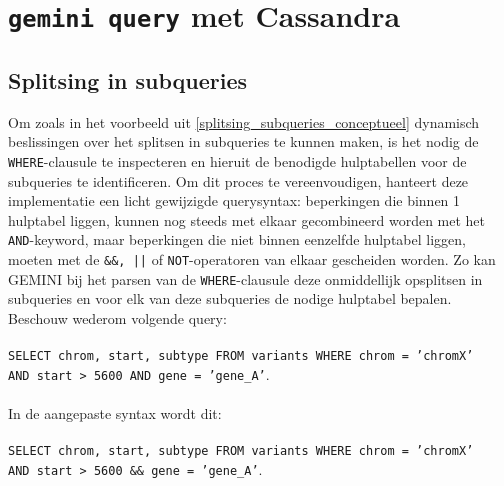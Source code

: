 \section{\texttt{gemini query} met Cassandra}
\label{gemini_query_impl}

\subsection{Splitsing in subqueries}


Om zoals in het voorbeeld uit \ref{splitsing_subqueries_conceptueel} dynamisch beslissingen over het splitsen in subqueries te kunnen maken, is het nodig de \texttt{WHERE}-clausule te inspecteren en hieruit de benodigde hulptabellen voor de subqueries te identificeren. Om dit proces te vereenvoudigen, hanteert deze implementatie een licht gewijzigde querysyntax: beperkingen die binnen 1 hulptabel liggen, kunnen nog steeds met elkaar gecombineerd worden met het \texttt{AND}-keyword, maar beperkingen die niet binnen eenzelfde hulptabel liggen, moeten met de \texttt{\&\&, ||} of \texttt{NOT}-operatoren van elkaar gescheiden worden. Zo kan GEMINI bij het parsen van de \texttt{WHERE}-clausule deze onmiddellijk opsplitsen in subqueries en voor elk van deze subqueries de nodige hulptabel bepalen. Beschouw wederom volgende query:\\\\
\texttt{SELECT chrom, start, subtype FROM variants WHERE chrom = 'chromX' \\AND start > 5600 AND gene = 'gene\_A'}.\\\\
In de aangepaste syntax wordt dit:\\\\
\texttt{SELECT chrom, start, subtype FROM variants WHERE chrom = 'chromX' \\AND start > 5600 \&\& gene = 'gene\_A'}.\\

